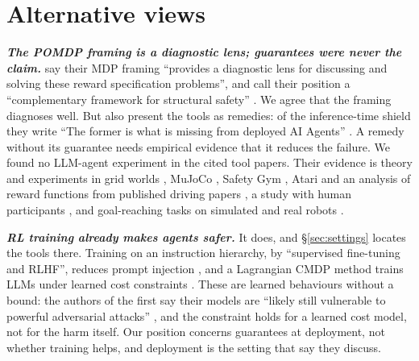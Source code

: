 \documentclass{article}
\begin{document}
\hypertarget{sec:alternatives}{%
\section{Alternative views}\label{sec:alternatives}}

\textbf{\emph{The POMDP framing is a diagnostic lens; guarantees were never the claim.}} \citet[§4]{mclean2026} say their MDP framing ``provides a diagnostic lens for discussing and solving these reward specification problems'', and call their position a ``complementary framework for structural safety'' \citep[§5]{mclean2026}. We agree that the framing diagnoses well. But \citet{mclean2026} also present the tools as remedies: of the inference-time shield they write ``The former is what is missing from deployed AI Agents'' \citep[§3.6.2]{mclean2026}. A remedy without its guarantee needs empirical evidence that it reduces the failure. We found no LLM-agent experiment in the cited tool papers. Their evidence is theory and experiments in grid worlds \citep{tse2025, mohammedalamen2025a}, MuJoCo \citep{satija2020}, Safety Gym \citep{wachi2023}, Atari \citep{klissarov2023} and an analysis of reward functions from published driving papers \citep{knox2023}, a study with human participants \citep{muslimani2025}, and goal-reaching tasks on simulated and real robots \citep{vasan2024}.

\textbf{\emph{RL training already makes agents safer.}} It does, and §\ref{sec:settings} locates the tools there. Training on an instruction hierarchy, by ``supervised fine-tuning and RLHF'', reduces prompt injection \citep{wallace2024}, and a Lagrangian CMDP method trains LLMs under learned cost constraints \citep{dai2023}. These are learned behaviours without a bound: the authors of the first say their models are ``likely still vulnerable to powerful adversarial attacks'' \citep{wallace2024}, and the constraint holds for a learned cost model, not for the harm itself. Our position concerns guarantees at deployment, not whether training helps, and deployment is the setting that \citet[§3.4]{mclean2026} say they discuss.
\end{document}
